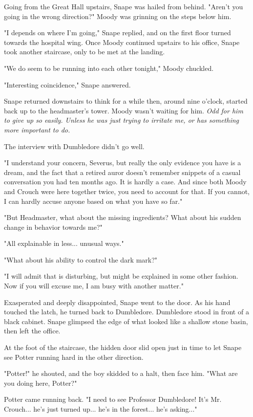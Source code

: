 \documentclass[a4paper,11pt]{article}
\begin{document}
Going from the Great Hall upstairs, Snape was hailed from behind. "Aren't you going in the wrong direction?" Moody was grinning on the steps below him.

"I depends on where I'm going," Snape replied, and on the first floor turned towards the hospital wing. Once Moody continued upstairs to his office, Snape took another staircase, only to be met at the landing.

"We do seem to be running into each other tonight," Moody chuckled.

"Interesting coincidence," Snape answered.

Snape returned downstairs to think for a while then, around nine o'clock, started back up to the headmaster's tower. Moody wasn't waiting for him. \emph{Odd for him to give up so easily. Unless he was just trying to irritate me, or has something more important to do.}

The interview with Dumbledore didn't go well.

"I understand your concern, Severus, but really the only evidence you have is a dream, and the fact that a retired auror doesn't remember snippets of a casual conversation you had ten months ago. It is hardly a case. And since both Moody and Crouch were here together twice, you need to account for that. If you cannot, I can hardly accuse anyone based on what you have so far."

"But Headmaster, what about the missing ingredients? What about his sudden change in behavior towards me?"

"All explainable in less... unusual ways."

"What about his ability to control the dark mark?"

"I will admit that is disturbing, but might be explained in some other fashion. Now if you will excuse me, I am busy with another matter."

Exasperated and deeply disappointed, Snape went to the door. As his hand touched the latch, he turned back to Dumbledore. Dumbledore stood in front of a black cabinet. Snape glimpsed the edge of what looked like a shallow stone basin, then left the office.

At the foot of the staircase, the hidden door slid open just in time to let Snape see Potter running hard in the other direction.

"Potter!" he shouted, and the boy skidded to a halt, then face him. "What are you doing here, Potter?"

Potter came running back. "I need to see Professor Dumbledore! It's Mr. Crouch... he's just turned up... he's in the forest... he's asking..."
\end{document}
